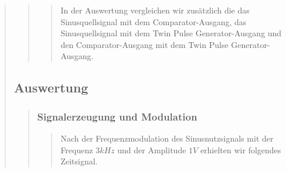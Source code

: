 \begin{quote}
\begin{quote}
\begin{quote}
        In der Auswertung vergleichen wir zusätzlich die das Sinusquellsignal
        mit dem Comparator-Ausgang, das Sinusquellsignal mit dem Twin Pulse
        Generator-Ausgang und den Comparator-Ausgang mit dem Twin Pulse
        Generator-Ausgang.
         
        \end{quote}
        
    \end{quote}
    
    \subsection{Auswertung}
    \begin{quote}
    	
    	\subsubsection{Signalerzeugung und Modulation}
    	\begin{quote}
    	
        Nach der Frequenzmodulation des Sinusnutzsignals mit der Frequenz 
        $3 kHz$ und der Amplitude $1 V$ erhielten wir folgendes Zeitsignal.
    	

\end{quote}
\end{quote}
\end{quote}
